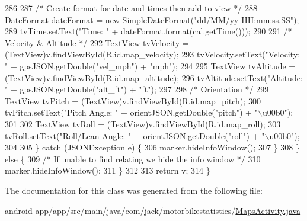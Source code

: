 \begin{DoxyCode}
286 
287                     \textcolor{comment}{/* Create format for date and times then add to view */}
288                     DateFormat dateFormat = \textcolor{keyword}{new} SimpleDateFormat(\textcolor{stringliteral}{"dd/MM/yy HH:mm:ss.SS"});
289                     tvTime.setText(\textcolor{stringliteral}{"Time: "} + dateFormat.format(cal.getTime()));
290 
291                     \textcolor{comment}{/* Velocity & Altitude */}
292                     TextView tvVelocity = (TextView)v.findViewById(R.id.map\_velocity);
293                     tvVelocity.setText(\textcolor{stringliteral}{"Velocity: "} + gpsJSON.getDouble(\textcolor{stringliteral}{"vel\_mph"}) + \textcolor{stringliteral}{"mph"});
294 
295                     TextView tvAltitude = (TextView)v.findViewById(R.id.map\_altitude);
296                     tvAltitude.setText(\textcolor{stringliteral}{"Altitude: "} + gpsJSON.getDouble(\textcolor{stringliteral}{"alt\_ft"}) + \textcolor{stringliteral}{"ft"});
297 
298                     \textcolor{comment}{/* Orientation */}
299                     TextView tvPitch = (TextView)v.findViewById(R.id.map\_pitch);
300                     tvPitch.setText(\textcolor{stringliteral}{"Pitch Angle: "} + orientJSON.getDouble(\textcolor{stringliteral}{"pitch"}) + \textcolor{stringliteral}{"\(\backslash\)u00b0"});
301 
302                     TextView tvRoll = (TextView)v.findViewById(R.id.map\_roll);
303                     tvRoll.setText(\textcolor{stringliteral}{"Roll/Lean Angle: "} + orientJSON.getDouble(\textcolor{stringliteral}{"roll"}) + \textcolor{stringliteral}{"\(\backslash\)u00b0"});
304 
305                 \} \textcolor{keywordflow}{catch} (JSONException e) \{
306                     marker.hideInfoWindow();
307                 \}
308             \} \textcolor{keywordflow}{else} \{
309                 \textcolor{comment}{/* If unable to find relating we hide the info window */}
310                 marker.hideInfoWindow();
311             \}
312 
313             \textcolor{keywordflow}{return} v;
314         \}
\end{DoxyCode}


The documentation for this class was generated from the following file\+:\begin{DoxyCompactItemize}
\item 
android-\/app/app/src/main/java/com/jack/motorbikestatistics/\hyperlink{_maps_activity_8java}{Maps\+Activity.\+java}\end{DoxyCompactItemize}

